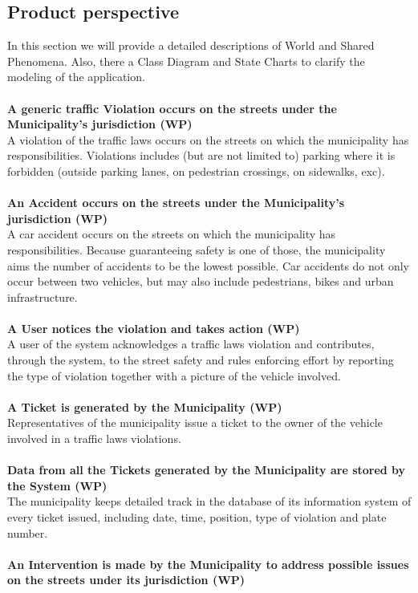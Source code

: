 \documentclass {article}
\begin{document}
	\subsection{Product perspective} 
	In this section we will provide a detailed descriptions of World and Shared Phenomena. Also, there  a Class Diagram and State Charts to clarify the modeling of the application. \\ \\
	{\bf A generic traffic Violation occurs on the streets under the \mbox{Municipality's} jurisdiction (WP)} \\
		A violation of the traffic laws occurs on the streets on which the municipality has responsibilities.
Violations includes (but are not limited to) parking where it is forbidden (outside parking lanes, on pedestrian crossings, on sidewalks, exc). \\ \\
	{\bf An Accident occurs on the streets under the Municipality's jurisdiction (WP)} \\
		A car accident occurs on the streets on which the municipality has responsibilities. Because guaranteeing safety is one of those, the municipality aims the number of accidents to be the lowest possible. Car accidents do not only occur between two vehicles, but may also include pedestrians, bikes and urban infrastructure. \\ \\
	{\bf A User notices the violation and takes action (WP)} \\
		A user of the system acknowledges a traffic laws violation and contributes, through the system, to the street safety and rules enforcing effort by reporting the type of violation together with a picture of the vehicle involved. \\ \\
	{\bf A Ticket is generated by the Municipality (WP)}\\
		Representatives of the municipality issue a ticket to the owner of the vehicle involved in a traffic laws violations. \\ \\
	{\bf Data from all the Tickets generated by the Municipality are stored by the System (WP)}\\
		The municipality keeps detailed track in the database of its information system of every ticket issued, including date, time, position, type of violation and plate number.\\ \\
	{\bf An Intervention is made by the Municipality to address possible issues on the streets under its jurisdiction (WP)} \\
\end{document}
